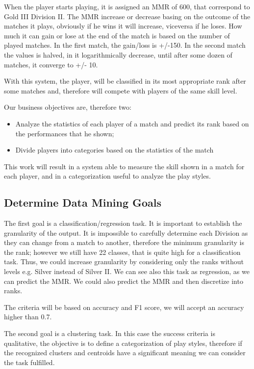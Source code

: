 When the player starts playing, it is assigned an MMR of 600, that correspond to Gold III Division II. The MMR increase or decrease basing on the outcome of the matches it plays, obviously if he wins it will increase, viceversa if he loses. How much it can gain or lose at the end of the match is based on the number of played matches. In the first match, the gain/loss is +/-150. In the second match the values is halved, in it logarithmically decrease, until after some dozen of matches, it converge to +/- 10.

With this system, the player, will be classified in its most appropriate rank after some matches and, therefore will compete with players of the same skill level.

Our business objectives are, therefore two:
\begin{itemize}
    \item Analyze the statistics of each player of a match and predict its rank based on the performances that he shown;
    \item Divide players into categories based on the statistics of the match
\end{itemize}


This work will result in a system able to measure the skill shown in a match for each player, and in a categorization useful to analyze the play styles.

\subsection{Determine Data Mining Goals}
\label{sec:min_goal}
The first goal is a classification/regression task. It is important to establish the granularity of the output. It is impossible to carefully determine each Division as they can change from a match to another, therefore the minimum granularity is the rank; however we still have 22 classes, that is quite high for a classification task. Thus, we could increase granularity by considering only the ranks without levels e.g. Silver instead of Silver II. We can see also this task as regression, as we can predict the MMR. We could also predict the MMR and then discretize into ranks.

The criteria will be based on accuracy and F1 score, we will accept an accuracy higher than 0.7.

The second goal is a clustering task. In this case the success criteria is qualitative, the objective is to define a categorization of play styles, therefore if the recognized clusters and centroids have a significant meaning we can consider the task fulfilled.